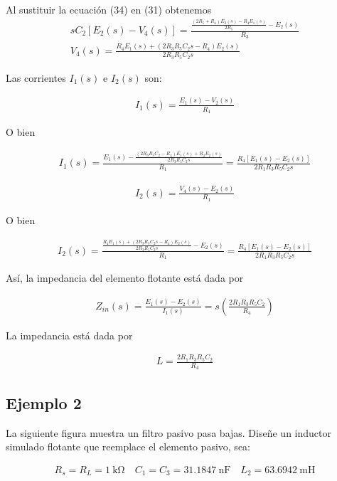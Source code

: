 \documentclass{article}
\begin{document}
Al sustituir la ecuación (34) en (31) obtenemos
\begin{align}
	sC_2 \left[ E_2(s) - V_4(s) \right] = \frac{ \frac{(2R_5 + R_4)E_2(s) - R_4E_1(s)}{2R_5} - E_2(s) }{R_3} \nonumber \\
	V_4(s) = \frac{R_4E_1(s) + (2R_3R_5C_2s - R_4)E_2(s)}{2R_3R_5C_2s}
\end{align}

Las corrientes $I_1(s)$ e $I_2(s)$ son:

\begin{align}
	I_1(s) = \frac{E_1(s) - V_2(s)}{R_1}
\end{align}

O bien

\begin{align}
	I_1(s) = \frac{E_1(s) - \frac{(2R_3R_5C_2 - R_4)E_1(s) + R_4E_2(s)}{2R_3R_5C_2s} }{R_1} = \frac{R_4 \left[ E_1(s) - E_2(s) \right]}{2R_1R_3R_5C_2s}
\end{align}

\begin{align}
	I_2(s) = \frac{V_4(s) - E_2(s)}{R_1}
\end{align}

O bien

\begin{align}
	I_2(s) = \frac{ \frac{R_4E_1(s) + (2R_3R_5C_2s - R_4)E_2(s)}{2R_3R_5C_2s} - E_2(s) }{R_1} = \frac{R_4 \left[ E_1(s) - E_2(s) \right]}{2R_1R_3R_5C_2s}
\end{align}

Así, la impedancia del elemento flotante está dada por

\begin{align}
	Z_{in}(s) = \frac{E_1(s) - E_2(s)}{I_1(s)} = s \left( \frac{2R_1R_3R_5C_2}{R_4} \right)
\end{align}

La impedancia está dada por

\begin{align}
	L = \frac{2R_1R_3R_5C_2}{R_4}
\end{align}

\subsection{Ejemplo 2}
La siguiente figura muestra un filtro pasivo pasa bajas. Diseñe un inductor simulado flotante que reemplace el elemento pasivo, sea:

\begin{align}
	R_s = R_L = \qty{1}{\kilo \ohm} \quad C_1 = C_3 = \qty{31.1847}{\nano \farad} \quad L_2 = \qty{63.6942}{\milli \henry}
\end{align} 
\end{document}
